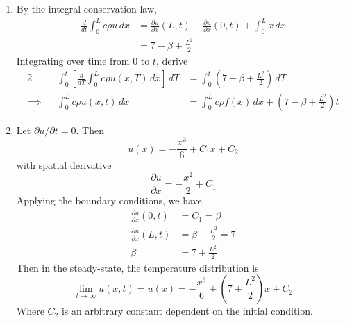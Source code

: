 \documentclass[a4paper]{article}
\begin{document}
\begin{enumerate}[label=(\alph*)]
	\item By the integral conservation law,
	\begin{align*}
		\frac{d }{dt}\int^{L}_{0} c \rho u \, dx & = \frac{\partial u}{\partial x}\!\left( L,t \right) - \frac{\partial u}{\partial x}\!\left( 0,t \right) + \int^{L}_{0} x \, dx \\
		 & = 7 - \beta + \frac{L^{2}}{2}
	\end{align*}
	Integrating over time from \( 0 \) to \( t \), derive
	\begin{alignat*}{2}
		 && \int^{t}_{0} \!\left[ \frac{d }{dT}\int^{L}_{0} c \rho u \!\left( x,T \right)\, dx \right] \, dT & = \int^{t}_{0} \!\left( 7 - \beta + \frac{L^{2}}{2} \right) \, dT \\
		\implies && \int^{L}_{0} c \rho u \!\left( x,t \right) \, dx & = \int^{L}_{0} c \rho f \!\left( x \right) \, dx + \!\left( 7 - \beta + \frac{L^{2}}{2} \right)t
	\end{alignat*}
	\item Let \( \partial u / \partial t = 0 \). Then
	\[
		u \!\left( x \right) = -\frac{x^{3}}{6} + C_{1}x + C_{2} 
	\]
	with spatial derivative
	\[
		\frac{\partial u}{\partial x} = -\frac{x^{2}}{2} + C_{1} 
	\]
	Applying the boundary conditions, we have
	\begin{align*}
		\frac{\partial u}{\partial x}\!\left( 0,t \right) & = C_{1} = \beta \\
		\frac{\partial u}{\partial x}\!\left( L,t \right) & = \beta - \frac{L^{2}}{2} = 7 \\ 
		\beta & = 7 + \frac{L^{2}}{2}
	\end{align*}
	Then in the steady-state, the temperature distribution is
	\[
		\lim\limits_{t \to \infty} u \!\left( x,t \right) = u \!\left( x \right) = -\frac{x^{3}}{6} + \!\left( 7 + \frac{L^{2}}{2} \right)x + C_{2} 
	\]
	Where \( C_{2} \) is an arbitrary constant dependent on the initial condition.
\end{enumerate}

\end{document}
